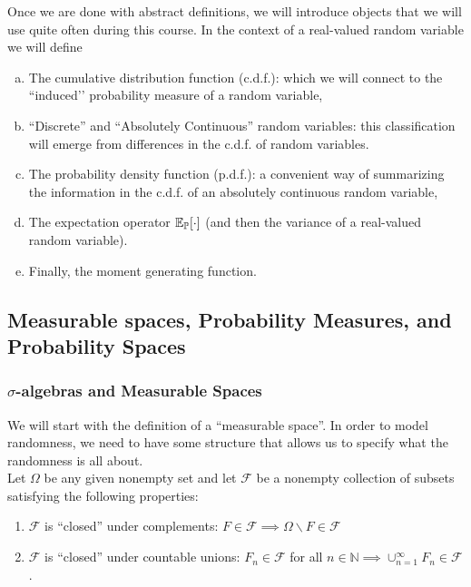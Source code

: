 \documentclass[11pt]{article} %
\begin{document}
Once we are done with abstract definitions, we will introduce objects that we will use quite often during this course. In the context of a real-valued random variable we will define

\begin{enumerate}[a)]
\item The cumulative distribution function (c.d.f.): which we will connect to the ``induced’’ probability measure of a random variable, 
\item ``Discrete'' and ``Absolutely Continuous'' random variables: this classification will emerge from differences in the c.d.f. of random variables. 

\item The probability density function (p.d.f.): a convenient way of summarizing the information in the c.d.f. of an absolutely continuous random variable, 

\item The expectation operator $\mathbb{E}_{\mathbb{P}}[\cdot]$ (and then the variance of a real-valued random variable). 

\item Finally, the moment generating function. 

\end{enumerate}

\subsection{Measurable spaces, Probability Measures, and Probability Spaces} 


\subsubsection{$\sigma$-algebras and Measurable Spaces}
We will start with the definition of a ``measurable space''. In order to model randomness, we need to have some structure that allows us to specify what the randomness is all about. \\

Let $\Omega$ be any given nonempty set and let $\mathcal{F}$ be a nonempty collection of subsets satisfying the following properties:
\begin{enumerate}
	\item $\mathcal{F}$ is ``closed'' under complements: $F \in \mathcal{F} \implies \Omega \backslash F \in \mathcal{F}$
	\item $\mathcal{F}$ is ``closed'' under countable unions: $F_{n} \in \mathcal{F}$ for all $n \in \mathbb{N} \implies \cup_{n=1}^{\infty} F_n \in \mathcal{F}$.
\end{enumerate}
\end{document}
